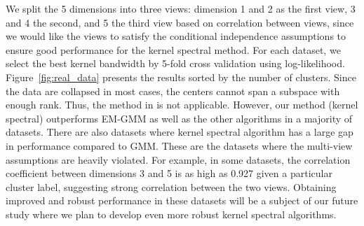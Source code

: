 \documentclass{article}
\newcommand{\aacomment}[1]{\noindent{\textcolor{blue}{\textbf{\#\#\# AA:} \textsf{#1} \#\#\#}}}
\begin{document}
We split the 5 dimensions into three views: dimension 1 and 2 as the first view, 3 and 4 the second, and 5 the third view based on correlation between views, since we would like the views to satisfy the conditional independence assumptions to ensure good performance for the kernel spectral method. For each dataset, we select the best kernel bandwidth by 5-fold cross validation using log-likelihood. Figure~\ref{fig:real_data} presents the results sorted by the number of clusters. Since the data are collapsed in most cases, the centers cannot span a subspace with enough rank. Thus, the method in \citep{HsuKak13} is not applicable. However, our method (kernel spectral) outperforms EM-GMM as well as the other algorithms in a majority of datasets. There are also datasets where kernel spectral algorithm has a large gap in performance compared to GMM. These are the datasets where the multi-view assumptions are heavily violated. For example, in some datasets, the correlation coefficient between dimensions 3 and 5 is as high as 0.927 given a particular cluster label, suggesting strong correlation between the two views. Obtaining improved and robust performance in these datasets will be a subject of our future study where we plan to develop even more robust kernel spectral algorithms.

%
\end{document}
